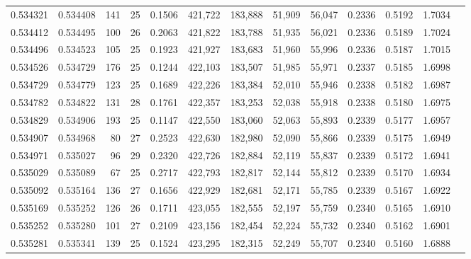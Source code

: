 \begin{tabular}{rrrrrrrrrrrrr}
0.534321 & 0.534408 & 141 &  25 &                                     0.1506 & 421,722 & 183,888 &  51,909 &  56,047 & 0.2336 & 0.5192 & 1.7034 \\
0.534412 & 0.534495 & 100 &  26 &                                     0.2063 & 421,822 & 183,788 &  51,935 &  56,021 & 0.2336 & 0.5189 & 1.7024 \\
0.534496 & 0.534523 & 105 &  25 &                                     0.1923 & 421,927 & 183,683 &  51,960 &  55,996 & 0.2336 & 0.5187 & 1.7015 \\
0.534526 & 0.534729 & 176 &  25 &                                     0.1244 & 422,103 & 183,507 &  51,985 &  55,971 & 0.2337 & 0.5185 & 1.6998 \\
0.534729 & 0.534779 & 123 &  25 &                                     0.1689 & 422,226 & 183,384 &  52,010 &  55,946 & 0.2338 & 0.5182 & 1.6987 \\
0.534782 & 0.534822 & 131 &  28 &                                     0.1761 & 422,357 & 183,253 &  52,038 &  55,918 & 0.2338 & 0.5180 & 1.6975 \\
0.534829 & 0.534906 & 193 &  25 &                                     0.1147 & 422,550 & 183,060 &  52,063 &  55,893 & 0.2339 & 0.5177 & 1.6957 \\
0.534907 & 0.534968 &  80 &  27 &                                     0.2523 & 422,630 & 182,980 &  52,090 &  55,866 & 0.2339 & 0.5175 & 1.6949 \\
0.534971 & 0.535027 &  96 &  29 &                                     0.2320 & 422,726 & 182,884 &  52,119 &  55,837 & 0.2339 & 0.5172 & 1.6941 \\
0.535029 & 0.535089 &  67 &  25 &                                     0.2717 & 422,793 & 182,817 &  52,144 &  55,812 & 0.2339 & 0.5170 & 1.6934 \\
0.535092 & 0.535164 & 136 &  27 &                                     0.1656 & 422,929 & 182,681 &  52,171 &  55,785 & 0.2339 & 0.5167 & 1.6922 \\
0.535169 & 0.535252 & 126 &  26 &                                     0.1711 & 423,055 & 182,555 &  52,197 &  55,759 & 0.2340 & 0.5165 & 1.6910 \\
0.535252 & 0.535280 & 101 &  27 &                                     0.2109 & 423,156 & 182,454 &  52,224 &  55,732 & 0.2340 & 0.5162 & 1.6901 \\
0.535281 & 0.535341 & 139 &  25 &                                     0.1524 & 423,295 & 182,315 &  52,249 &  55,707 & 0.2340 & 0.5160 & 1.6888 \\

\end{tabular}
